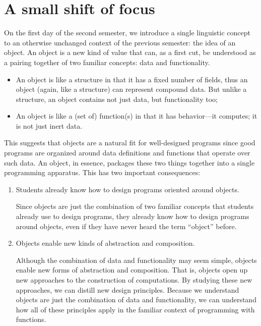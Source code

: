 \documentclass[submission,copyright]{eptcs}
\begin{document}
\section{A small shift of focus}
\label{sec:shift}

On the first day of the second semester, we introduce a single
linguistic concept to an otherwise unchanged context of the previous
semester: the idea of an object.
%
An object is a new kind of value that can, as a first cut, be
understood as a pairing together of two familiar concepts: data and
functionality.

\begin{itemize}
\item An object is like a structure in that it has a fixed number of
fields, thus an object (again, like a structure) can represent
compound data. But unlike a structure, an object contains not just
data, but functionality too;

\item An object is like a (set of) function(s) in that it has behavior---it computes; it is
not just inert data.
\end{itemize}

This suggests that objects are a natural fit for well-designed programs
since good programs are organized around data definitions and
functions that operate over such data. An object, in essence, packages
these two things together into a single programming apparatus. This
has two important consequences:

\begin{enumerate}

\item Students already know how to design programs oriented around objects.

Since objects are just the combination of two familiar concepts that
students already use to design programs, they already know how to
design programs around objects, even if they have never heard the term
``object'' before.

\item Objects enable new kinds of abstraction and composition.

Although the combination of data and functionality may seem simple,
objects enable new forms of abstraction and composition. That is,
objects open up new approaches to the construction of computations. By
studying these new approaches, we can distill new design
principles. Because we understand objects are just the combination of
data and functionality, we can understand how all of these principles
apply in the familiar context of programming with functions. 
\end{enumerate}
\end{document}
